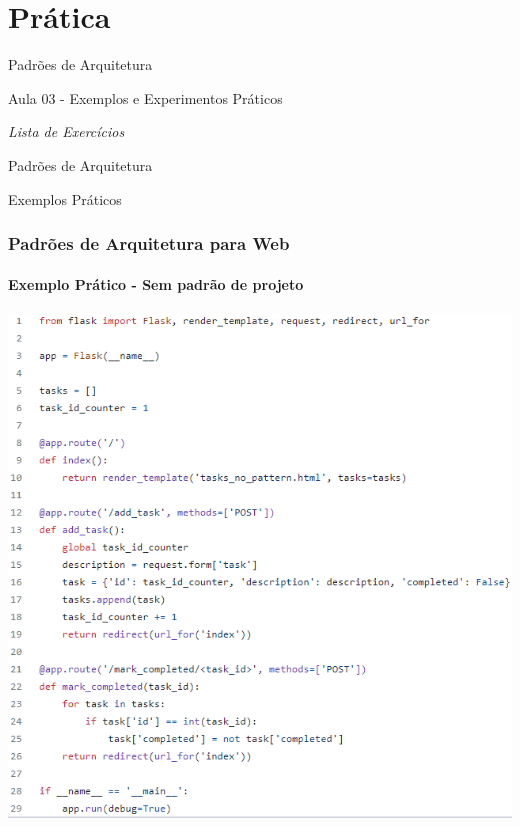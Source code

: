 \documentclass[
	10pt, %
	t, %
]{beamer}
\begin{document}

\section{Prática}

\begin{frame}
	\begin{center}
		
		\bigskip\bigskip\bigskip\bigskip %
		{\Large Padrões de Arquitetura}
		
		\bigskip\bigskip %
		{\Huge Aula 03 - Exemplos e Experimentos Práticos}
		
		\smallskip
		{\small \textit{Lista de Exercícios}}
	\end{center}

\end{frame}


\begin{frame}
	\begin{center}
		
		\bigskip\bigskip\bigskip\bigskip %
		{\Large Padrões de Arquitetura}
		
		\bigskip\bigskip %
		{\Huge Exemplos Práticos}
	\end{center}

\end{frame}

\begin{frame}
	\frametitle{Padrões de Arquitetura para Web}
	\framesubtitle{Exemplo Prático - Sem padrão	de projeto}

	\includegraphics[width=0.6\linewidth]{Images/no_pattern.png}

\end{frame}
\end{document}
